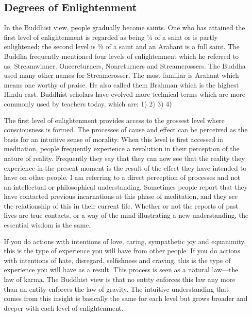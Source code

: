 \documentclass[a5paper,10pt,english]{book}
\begin{document}
\subsection{Degrees of Enlightenment}
\label{\detokenize{saints:degrees-of-enlightenment}}
\sphinxAtStartPar
In the Buddhist view, people gradually become saints. One who has
attained the first level of enlightenment is regarded as being ¼ of a
saint or is partly enlightened; the second level is ½ of a saint and an
Arahant is a full saint. The Buddha frequently mentioned four levels of
enlightenment which he referred to as: Stream\sphinxhyphen{}winner, Once\sphinxhyphen{}returners,
Non\sphinxhyphen{}returners and Stream\sphinxhyphen{}crossers. The Buddha used many other names for
Stream\sphinxhyphen{}crosser. The most familiar is Arahant which means one worthy of
praise. He also called them Brahman which is the highest Hindu cast.
Buddhist scholars have evolved more technical terms which are more
commonly used by teachers today, which are: 1)  2)
 3)  4) 

\sphinxAtStartPar
The first level of enlightenment provides access to the grossest level
where consciousness is formed. The processes of cause and effect can be
perceived as the basis for an intuitive sense of morality. When this
level is first accessed in meditation, people frequently experience a
revolution in their perception of the nature of reality. Frequently they
say that they can now see that the reality they experience in the
present moment is the result of the effect they have intended to have on
other people. I am referring to a direct perception of processes and not
an intellectual or philosophical understanding. Sometimes people report
that they have contacted previous incarnations at this phase of
meditation, and they see the relationship of this in their current life.
Whether or not the reports of past lives are true contacts, or a way of
the mind illustrating a new understanding, the essential wisdom is the
same.

\sphinxAtStartPar
If you do actions with intentions of love, caring, sympathetic joy and
equanimity, this is the type of experience you will have from other
people. If you do actions with intentions of hate, disregard,
selfishness and craving, this is the type of experience you will have as
a result. This process is seen as a natural law—the law of karma. The
Buddhist view is that no entity enforces this law any more than an
entity enforces the law of gravity. The intuitive understanding that
comes from this insight is basically the same for each level but grows
broader and deeper with each level of enlightenment.
\end{document}
